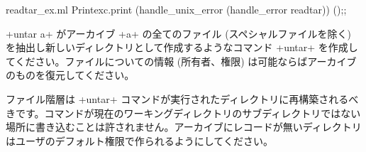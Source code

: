 \begin{answer}
\begin{listingcodefile}{readtar_ex.ml}
Printexc.print (handle_unix_error (handle_error readtar)) ();;
\end{listingcodefile}
\end{answer}

\begin{exercise}\label{ex/untar}
\ml+untar a+ がアーカイブ \ml+a+ の全てのファイル (スペシャルファイルを除く) を抽出し新しいディレクトリとして作成するようなコマンド \ml+untar+ を作成してください。ファイルについての情報 (所有者、権限) は可能ならばアーカイブのものを復元してください。

ファイル階層は \ml+untar+ コマンドが実行されたディレクトリに再構築されるべきです。コマンドが現在のワーキングディレクトリのサブディレクトリではない場所に書き込むことは許されません。アーカイブにレコードが無いディレクトリはユーザのデフォルト権限で作られるようにしてください。
\end{exercise}

